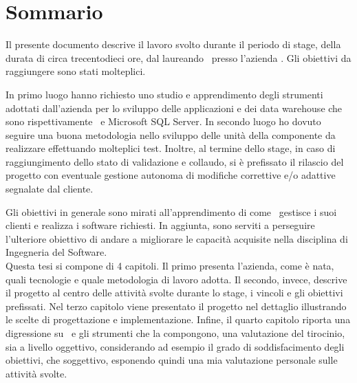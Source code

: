 
\cleardoublepage
{}
{}
\begingroup
\let\clearpage\relax
\let\cleardoublepage\relax
\let\cleardoublepage\relax

\chapter*{Sommario}

Il presente documento descrive il lavoro svolto durante il periodo di stage, della durata di circa trecentodieci ore, dal laureando \myName\ presso l'azienda \azienda .
Gli obiettivi da raggiungere sono stati molteplici.

In primo luogo hanno richiesto uno studio e apprendimento degli strumenti adottati dall'azienda per lo sviluppo delle applicazioni e dei data warehouse che sono rispettivamente \inde\ e  Microsoft SQL Server. In secondo luogo ho dovuto seguire una buona metodologia nello sviluppo delle unità della componente da realizzare effettuando molteplici test. Inoltre, al termine dello stage, in caso di raggiungimento dello stato di validazione e collaudo, si è prefissato il rilascio del progetto con eventuale gestione autonoma di modifiche correttive e/o adattive segnalate dal cliente.

Gli obiettivi in generale sono mirati all'apprendimento di come \azienda\ gestisce i suoi clienti e realizza i software richiesti. In aggiunta, sono serviti a perseguire l'ulteriore obiettivo di andare a migliorare le capacità acquisite nella disciplina di Ingegneria del Software.
\\

Questa tesi si compone di 4 capitoli. 
Il primo presenta l'azienda, come è nata, quali tecnologie e quale metodologia di lavoro adotta. Il secondo, invece, descrive il progetto al centro delle attività svolte durante lo stage, i vincoli e gli obiettivi prefissati. Nel terzo capitolo viene presentato il progetto nel dettaglio illustrando le scelte di progettazione e implementazione.
Infine, il quarto capitolo riporta una digressione su \inde\ e gli strumenti che la compongono, una valutazione del tirocinio, sia a livello oggettivo, considerando ad esempio il grado di soddisfacimento degli obiettivi, che soggettivo, esponendo quindi una mia valutazione personale sulle attività svolte.


%
%

\endgroup			

\vfill

